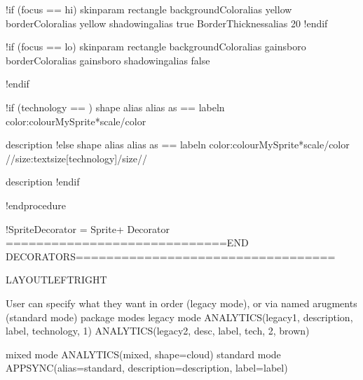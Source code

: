 \documentclass[letterpaper,10pt,english]{sphinxmanual}
\begin{document}
\begin{sphinxVerbatim}[commandchars=\\\{\},numbers=left,firstnumber=1,stepnumber=1]
!if (\PYGZdl{}focus == \PYGZdq{}hi\PYGZdq{})
    skinparam rectangle \PYGZob{}
        backgroundColor\PYGZlt{}\PYGZlt{}\PYGZdl{}alias\PYGZgt{}\PYGZgt{} yellow
        borderColor\PYGZlt{}\PYGZlt{}\PYGZdl{}alias\PYGZgt{}\PYGZgt{} yellow
        shadowing\PYGZlt{}\PYGZlt{}\PYGZdl{}alias\PYGZgt{}\PYGZgt{} true
        BorderThickness\PYGZlt{}\PYGZlt{}\PYGZdl{}alias\PYGZgt{}\PYGZgt{} 20
    \PYGZcb{}
!endif

!if  (\PYGZdl{}focus == \PYGZdq{}lo\PYGZdq{})
    skinparam rectangle \PYGZob{}
        backgroundColor\PYGZlt{}\PYGZlt{}\PYGZdl{}alias\PYGZgt{}\PYGZgt{} gainsboro
        borderColor\PYGZlt{}\PYGZlt{}\PYGZdl{}alias\PYGZgt{}\PYGZgt{} gainsboro
        shadowing\PYGZlt{}\PYGZlt{}\PYGZdl{}alias\PYGZgt{}\PYGZgt{} false
        
    \PYGZcb{}
!endif


!if (\PYGZdl{}technology == \PYGZdq{}\PYGZdq{})
    \PYGZdl{}shape \PYGZdl{}alias \PYGZlt{}\PYGZlt{}\PYGZdl{}alias\PYGZgt{}\PYGZgt{} as \PYGZdq{}
    == \PYGZdl{}label\PYGZbs{}n
    \PYGZlt{}color:\PYGZdl{}colour\PYGZgt{}\PYGZlt{}\PYGZdl{}MySprite*\PYGZdl{}scale\PYGZgt{}\PYGZlt{}/color\PYGZgt{}

    \PYGZdl{}description \PYGZdq{}
!else 
    \PYGZdl{}shape \PYGZdl{}alias \PYGZlt{}\PYGZlt{}\PYGZdl{}alias\PYGZgt{}\PYGZgt{} as \PYGZdq{}
    == \PYGZdl{}label\PYGZbs{}n
    \PYGZlt{}color:\PYGZdl{}colour\PYGZgt{}\PYGZlt{}\PYGZdl{}MySprite*\PYGZdl{}scale\PYGZgt{}\PYGZlt{}/color\PYGZgt{}
    //\PYGZlt{}size:\PYGZdl{}textsize\PYGZgt{}[\PYGZdl{}technology]\PYGZlt{}/size\PYGZgt{}//

    \PYGZdl{}description \PYGZdq{}
!endif

!endprocedure


!\PYGZdl{}SpriteDecorator = \PYGZdq{}\PYGZdl{}Sprite\PYGZdq{}+ \PYGZdq{}Decorator\PYGZdq{}
\PYGZsq{}=============================END DECORATORS==================================

LAYOUT\PYGZus{}LEFT\PYGZus{}RIGHT

\PYGZsq{} User can specify what they want in order (legacy mode), or via named arugments (standard mode)
package modes \PYGZob{}
\PYGZsq{}legacy mode
\PYGZdl{}ANALYTICS(\PYGZdq{}legacy1\PYGZdq{}, \PYGZdq{}description\PYGZdq{}, \PYGZdq{}label\PYGZdq{}, \PYGZdq{}technology\PYGZdq{}, 1)
\PYGZdl{}ANALYTICS(\PYGZdq{}legacy2\PYGZdq{}, \PYGZdq{}desc\PYGZdq{}, \PYGZdq{}label\PYGZdq{}, \PYGZdq{}tech\PYGZdq{}, 2, \PYGZdq{}brown\PYGZdq{})

\PYGZsq{}mixed mode
\PYGZdl{}ANALYTICS(\PYGZdq{}mixed\PYGZdq{}, \PYGZdl{}shape=\PYGZdq{}cloud\PYGZdq{})
\PYGZsq{}standard mode
\PYGZdl{}APPSYNC(\PYGZdl{}alias=\PYGZdq{}standard\PYGZdq{}, \PYGZdl{}description=\PYGZdq{}description\PYGZdq{}, \PYGZdl{}label=\PYGZdq{}label\PYGZdq{})
\PYGZcb{}


\end{sphinxVerbatim}
\end{document}
